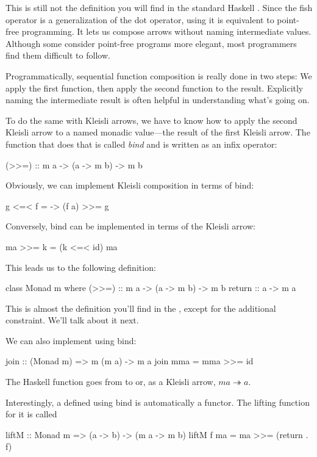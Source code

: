 \documentclass[DaoFP]{subfiles}
\begin{document}
This is still not the definition you will find in the standard Haskell . Since the fish operator is a generalization of the dot operator, using it is equivalent to point-free programming. It lets us compose arrows without naming intermediate values. Although some consider point-free programs more elegant, most programmers find them difficult to follow. 

Programmatically, sequential function composition is really done in two steps: We apply the first function, then apply the second function to the result. Explicitly naming the intermediate result is often helpful in understanding what's going on.

To do the same with Kleisli arrows, we have to know how to apply the second Kleisli arrow to a named monadic value---the result of the first Kleisli arrow. The function that does that is called \emph{bind} and is written as an infix operator:
\begin{haskell}
(>>=) :: m a -> (a -> m b) -> m b
\end{haskell}
Obviously, we can implement Kleisli composition in terms of bind:

\begin{haskell}
g <=< f = \a -> (f a) >>= g
\end{haskell}

Conversely, bind can be implemented in terms of the Kleisli arrow:
\begin{haskell}
ma >>= k = (k <=< id) ma
\end{haskell}

This leads us to the following definition:
\begin{haskell}
class Monad m where
  (>>=) :: m a -> (a -> m b) -> m b
  return :: a -> m a 
\end{haskell}
This is almost the definition you'll find in the , except for the additional  constraint. We'll talk about it next.

We can also implement  using bind:
\begin{haskell}
join  :: (Monad m) => m (m a) -> m a
join mma =  mma >>= id
\end{haskell}
The Haskell function  goes from  to  or, as a Kleisli arrow, $m a \twoheadrightarrow a$.

Interestingly, a  defined using bind is automatically a functor. The lifting function for it is called 
\begin{haskell}
liftM :: Monad m => (a -> b) -> (m a -> m b)
liftM f ma = ma >>= (return . f)
\end{haskell}
\end{document}
